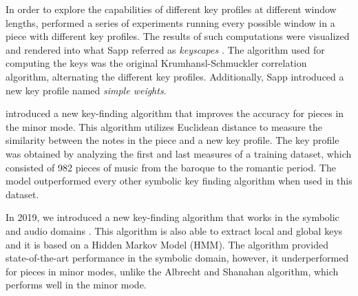 


In order to explore the capabilities of different key
profiles at different window lengths,
\textcite{sapp2011computational} performed a series of
experiments running every possible window in a piece with
different key profiles. The results of such computations
were visualized and rendered into what Sapp referred as
\emph{keyscapes} \parencite{sapp2011harmonic}. The algorithm
used for computing the keys was the original
Krumhansl-Schmuckler correlation algorithm, alternating the
different key profiles. Additionally, Sapp introduced a new
key profile named \emph{simple weights}.

\textcite{albrecht2013use} introduced a new key-finding
algorithm that improves the accuracy for pieces in the minor
mode. This algorithm utilizes Euclidean distance to measure
the similarity between the notes in the piece and a new key
profile. The key profile was obtained by analyzing the first
and last measures of a training dataset, which consisted of
982 pieces of music from the baroque to the romantic period.
The model outperformed every other symbolic key finding
algorithm when used in this dataset.




In 2019, we introduced a new key-finding algorithm that
works in the symbolic and audio domains
\parencite{napoleslopez2019keyfinding}. This algorithm is
also able to extract local and global keys and it is based
on a Hidden Markov Model (HMM). The algorithm provided
state-of-the-art performance in the symbolic domain,
however, it underperformed for pieces in minor modes, unlike
the Albrecht and Shanahan algorithm, which performs well in
the minor mode.

